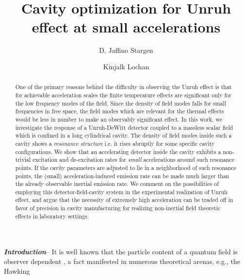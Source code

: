 \documentclass[aps,prl,nofootinbib,preprintnumbers,floatfix,twocolumn,superscriptaddress]{revtex4}
\begin{document}
\title{Cavity optimization for Unruh effect at small accelerations}
\author{D. Jaffino Stargen}
\author{Kinjalk Lochan}
\begin{abstract}
One of the primary reasons behind the difficulty in 
observing the Unruh effect is that for 
achievable acceleration scales the finite temperature effects are significant 
only for the low frequency modes of the field. Since the 
density of field modes falls for small frequencies in free space, the  
field modes which are relevant for the thermal effects would be less in number 
to make an observably significant effect.
In this work, we investigate the response of a Unruh-DeWitt detector coupled 
to a massless scalar field which is confined in a long cylindrical cavity. 
The density of field modes inside such a cavity shows a {\it resonance structure} i.e. 
it rises abruptly for some specific cavity configurations.
We show that an accelerating detector inside the cavity exhibits a non-trivial 
excitation and de-excitation rates for {\it small} accelerations 
around such resonance points. If the cavity parameters 
are adjusted to lie in a neighborhood of such resonance points,
the (small) acceleration-induced emission rate can be made much larger than the already 
observable inertial emission rate. We comment on the 
possibilities of employing this detector-field-cavity system in the experimental 
realization of Unruh effect, and argue that the necessity of extremely high 
acceleration can be traded off in favor of precision in cavity manufacturing for realizing 
non-inertial field theoretic effects in laboratory settings. 
\end{abstract}
\maketitle
\noindent
{\it {\bf Introduction}}-- It is well known that the particle content of a 
quantum field is observer dependent \cite{Fulling-1973}, a fact  manifested in 
numerous theoretical arenas, e.g., the Hawking 
\end{document}
